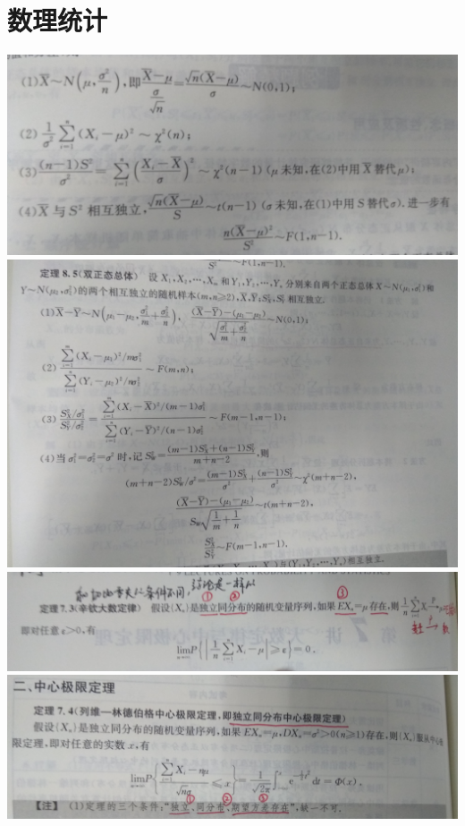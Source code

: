 \documentclass[UTF8]{ctexart}
\begin{document}
\section{数理统计}
\includegraphics[width=15cm]{9345E7/danzhengtai.jpg}
\includegraphics[width=15cm]{9345E7/shuangzhengtai.jpg}
\includegraphics[width=15cm]{9345E7/xinqin.jpg}
\includegraphics[width=15cm]{9345E7/zhongxinjixian.jpg}
\end{document}
